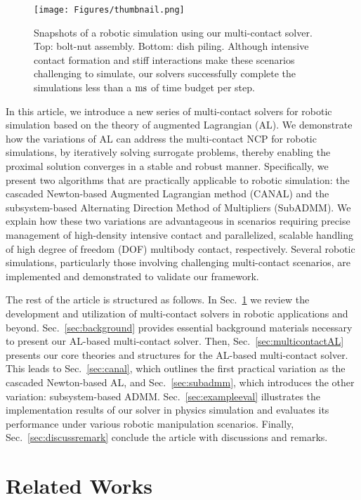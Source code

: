 \documentclass[lettersize,journal]{IEEEtran}
\begin{document}
\begin{figure}[t]
\centering
\texttt{[image: Figures/thumbnail.png]}
\caption{Snapshots of a robotic simulation using our multi-contact solver. Top: bolt-nut assembly. Bottom: dish piling. Although intensive contact formation and stiff interactions make these scenarios challenging to simulate, our solvers successfully complete the simulations less than a $\rm{ms}$ of time budget per step.}
\label{fig:thumbnail}
\end{figure}

In this article, we introduce a new series of multi-contact solvers for robotic simulation based on the theory of augmented Lagrangian (AL). 
We demonstrate how the variations of AL can address the multi-contact NCP for robotic simulations, by iteratively solving surrogate problems, thereby enabling the proximal solution converges in a stable and robust manner.
Specifically, we present two algorithms that are practically applicable to robotic simulation: the cascaded Newton-based Augmented Lagrangian method (CANAL) and the subsystem-based Alternating Direction Method of Multipliers (SubADMM).
We explain how these two variations are advantageous in scenarios requiring precise management of high-density intensive contact and parallelized, scalable handling of high degree of freedom (DOF) multibody contact, respectively.
Several robotic simulations, particularly those involving challenging multi-contact scenarios, are implemented and demonstrated to validate our framework.

The rest of the article is structured as follows. 
In Sec.~\ref{sec:relatedworks} we review the development and utilization of multi-contact solvers in robotic applications and beyond.
Sec.~\ref{sec:background} provides essential background materials necessary to present our AL-based multi-contact solver.
Then, Sec.~\ref{sec:multicontactAL} presents our core theories and structures for the AL-based multi-contact solver. This leads to Sec.~\ref{sec:canal}, which outlines the first practical variation as the cascaded Newton-based AL, and Sec.~\ref{sec:subadmm}, which introduces the other variation: subsystem-based ADMM.
Sec.~\ref{sec:exampleeval} illustrates the implementation results of our solver in physics simulation and evaluates its performance under various robotic manipulation scenarios.
Finally, Sec.~\ref{sec:discussremark} conclude the article with discussions and remarks.


\section{Related Works} \label{sec:relatedworks}
\end{document}
